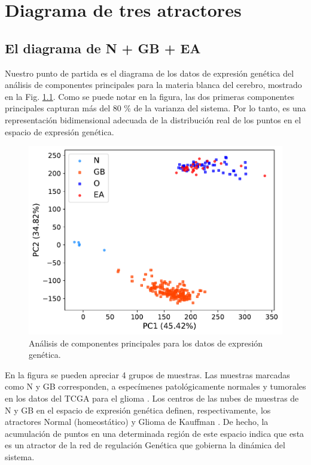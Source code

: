 \chapter{Diagrama de tres atractores}
\label{cap2}
\onehalfspacing


\section{El diagrama de N + GB + EA}\label{sec:ngbad}

Nuestro punto de partida es el diagrama de los datos de expresión genética del análisis de componentes principales para la materia blanca del cerebro, mostrado en la Fig. \ref{fig:fig1a}. Como se puede notar en la figura, las dos primeras componentes principales capturan más del 80 \% de la varianza del sistema. Por lo tanto, es una representación bidimensional adecuada de la distribución real de los puntos en el espacio de expresión genética.

\begin{figure}[!htb]
	\centering
	\includegraphics[width=0.75\linewidth]{figures/Fig_1a.pdf}
	\caption{\label{fig:fig1a}
		Análisis de componentes principales para los datos de expresión genética.}
\end{figure}

En la figura se pueden apreciar 4 grupos de muestras. Las muestras marcadas como N y GB corresponden, a especímenes patológicamente normales y tumorales en los datos del TCGA para el glioma \cite{Brennan_2013}. Los centros de las nubes de muestras de N y GB en el espacio de expresión genética definen, respectivamente, los atractores Normal (homeostático) y Glioma de Kauffman \cite{Huang_2009, Gonzalez_2023}. De hecho, la acumulación de puntos en una determinada región de este espacio indica que esta es un atractor de la red de regulación Genética que gobierna la dinámica del sistema.

